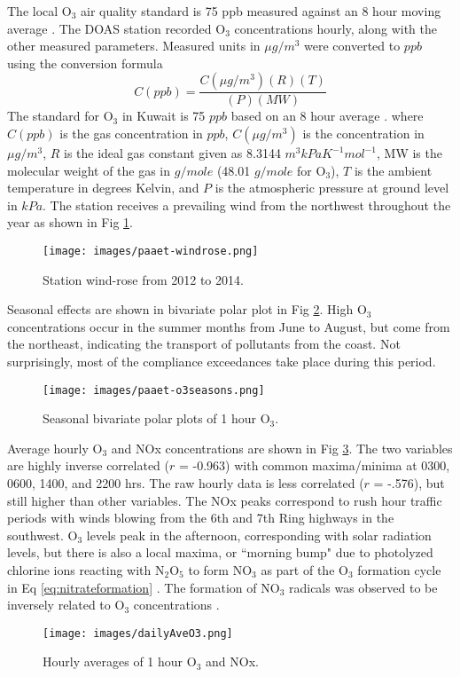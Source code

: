 \begin{linenumbers}
%
The local O$_{3}$ air quality standard is 75 ppb measured against an 8 hour moving average \citep{KEPA2017}. The DOAS station recorded O$_{3}$ concentrations hourly, along with the other measured parameters. Measured units in $\mu g/m^{3}$ were converted to $ppb$ using the conversion formula
%
\begin{equation}
\label{eq:gasequation}
C(ppb) = \frac{C(\mu g/m^{3})(R) (T)}{(P) (MW)}
\end{equation}
%
The standard for O$_{3}$ in Kuwait is 75 $ppb$ based on an 8 hour average \citep{KEPA2017}.
\noindent
where $C(ppb)$ is the gas concentration in $ppb$, $C(\mu g/m^{3})$ is the concentration in $\mu g/m^{3}$, $R$ is the ideal gas constant given as 8.3144 $m^{3}kPa K^{-1}mol^{-1}$, MW is the molecular weight of the gas in $g/mole$ (48.01 $g/mole$ for O$_{3}$), $T$ is the ambient temperature in degrees Kelvin, and $P$ is the atmospheric pressure at ground level in $kPa$. The station receives a prevailing wind from the northwest throughout the year as shown in Fig \ref{fig:windrose}.
%
\begin{figure}
\centering
\texttt{[image: images/paaet-windrose.png]}  %
\caption{Station wind-rose from 2012 to 2014.}
\label{fig:windrose}
\end{figure}
%
Seasonal effects are shown in bivariate polar plot in Fig \ref{fig:bipolarplots}. High O$_{3}$ concentrations occur in the summer months from June to August, but come from the northeast, indicating the transport of pollutants from the coast. Not surprisingly, most of the compliance exceedances take place during this period.
%
\begin{figure}
\centering
\texttt{[image: images/paaet-o3seasons.png]}  %
\caption{Seasonal bivariate polar plots of 1 hour O$_3$.}
\label{fig:bipolarplots}
\end{figure}
%
Average hourly O$_{3}$ and NOx concentrations are shown in Fig \ref{fig:hourlyAveO3}. The two variables are highly inverse correlated ($r$ = -0.963) with common maxima/minima at 0300, 0600, 1400, and 2200 hrs. The raw hourly data is less correlated ($r$ = -.576), but still higher than other variables. The NOx peaks correspond to rush hour traffic periods with winds blowing from the 6th and 7th Ring highways in the southwest. O$_{3}$ levels peak in the afternoon, corresponding with solar radiation levels, but there is also a local maxima, or ``morning bump" due to photolyzed chlorine ions reacting with N$_{2}$O$_{5}$ to form NO$_{3}$ as part of the O$_{3}$ formation cycle in Eq \ref{eq:nitrateformation} \citep{Calvert2015}. The formation of NO$_{3}$ radicals was observed to be inversely related to O$_{3}$ concentrations \citep{Song2011}.
%
\begin{figure}
\centering
\texttt{[image: images/dailyAveO3.png]}  %
\caption{Hourly averages of 1 hour O$_{3}$ and NOx.}
\label{fig:hourlyAveO3}
\end{figure}
%


\end{linenumbers}
